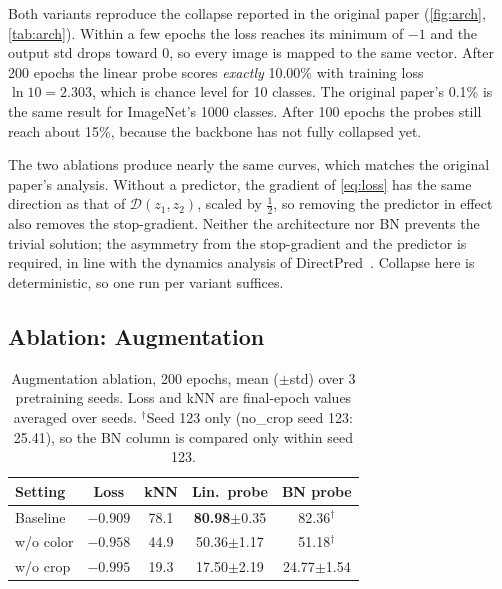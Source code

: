 \documentclass[10pt,twocolumn,letterpaper]{article}
\newcommand{\pmstd}[1]{{\scriptsize$\pm$#1}}
\begin{document}
Both variants reproduce the collapse reported in the original paper (\cref{fig:arch}, \cref{tab:arch}).
Within a few epochs the loss reaches its minimum of $-1$ and the output std drops toward 0, so every image is mapped to the same vector.
After 200 epochs the linear probe scores \emph{exactly} 10.00\% with training loss $\ln 10 = 2.303$, which is chance level for 10 classes. The original paper's 0.1\% is the same result for ImageNet's 1000 classes.
After 100 epochs the probes still reach about 15\%, because the backbone has not fully collapsed yet.

The two ablations produce nearly the same curves, which matches the original paper's analysis. Without a predictor, the gradient of \cref{eq:loss} has the same direction as that of $\mathcal{D}(z_1,z_2)$, scaled by $\tfrac12$, so removing the predictor in effect also removes the stop-gradient.
Neither the architecture nor BN prevents the trivial solution; the asymmetry from the stop-gradient and the predictor is required, in line with the dynamics analysis of DirectPred~\cite{tian2021directpred}.
Collapse here is deterministic, so one run per variant suffices.

\subsection{Ablation: Augmentation}
\label{sec:exp_aug}

\begin{table}[t]
\centering
\small
\setlength\tabcolsep{3pt}
\begin{tabular}{lcccc}
\toprule
Setting & Loss & kNN & Lin.\ probe & BN probe \\
\midrule
Baseline & $-0.909$ & 78.1 & \textbf{80.98}\pmstd{0.35} & 82.36$^\dagger$ \\
w/o color & $-0.958$ & 44.9 & 50.36\pmstd{1.17} & 51.18$^\dagger$ \\
w/o crop & $-0.995$ & 19.3 & 17.50\pmstd{2.19} & 24.77\pmstd{1.54} \\
\bottomrule
\end{tabular}
\caption{Augmentation ablation, 200 epochs, mean (\pmstd{std}) over 3 pretraining seeds. Loss and kNN are final-epoch values averaged over seeds. $^\dagger$Seed 123 only (no\_crop seed 123: 25.41), so the BN column is compared only within seed 123.}
\label{tab:aug}
\end{table}
\end{document}
